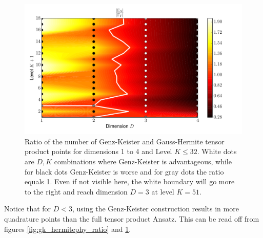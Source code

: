 \documentclass[a4paper,10pt]{article}
\begin{document}
\begin{figure}[h]
  \centering
  \includegraphics[width=0.8\linewidth]{./img/gk_hermitephy_ratio_large.pdf}
  \caption{Ratio of the number of Genz-Keister and Gauss-Hermite tensor product
  points for dimensions 1 to 4 and Level $K \leq 32$. White dots are $D,K$
  combinations where Genz-Keister is advantageous, while for black dots
  Genz-Keister is worse and for gray dots the ratio equals 1. Even if not visible here,
  the white boundary will go more to the right and reach dimension $D = 3$ at level $K = 51$.}
  \label{fig:gk_hermitephy_ratio_large}
\end{figure}

Notice that for $D < 3$, using the Genz-Keister construction results
in more quadrature points than the full tensor product Ansatz. This
can be read off from figures \ref{fig:gk_hermitephy_ratio}
and \ref{fig:gk_hermitephy_ratio_large}.
\end{document}
